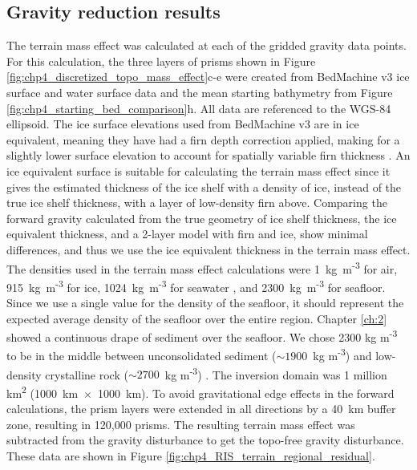 \subsection{Gravity reduction results}

The terrain mass effect was calculated at each of the gridded gravity data points. For this calculation, the three layers of prisms shown in Figure \ref{fig:chp4_discretized_topo_mass_effect}c-e were created from BedMachine v3 \citep{morlighemdeep2020, morlighemmeasures2022} ice surface and water surface data and the mean starting bathymetry from Figure \ref{fig:chp4_starting_bed_comparison}h. All data are referenced to the WGS-84 ellipsoid. The ice surface elevations used from BedMachine v3 are in ice equivalent, meaning they have had a firn depth correction applied, making for a slightly lower surface elevation to account for spatially variable firn thickness \citep{morlighemdeep2020}. An ice equivalent surface is suitable for calculating the terrain mass effect since it gives the estimated thickness of the ice shelf with a density of ice, instead of the true ice shelf thickness, with a layer of low-density firn above. Comparing the forward gravity calculated from the true geometry of ice shelf thickness, the ice equivalent thickness, and a 2-layer model with firn and ice, show minimal differences, and thus we use the ice equivalent thickness in the terrain mass effect. The densities used in the terrain mass effect calculations were 1~kg~m\textsuperscript{-3} for air, 915~kg~m\textsuperscript{-3} for ice, 1024~kg~m\textsuperscript{-3} for seawater \citep{griggsantarctic2011}, and 2300~kg~m\textsuperscript{-3} for seafloor. Since we use a single value for the density of the seafloor, it should represent the expected average density of the seafloor over the entire region. Chapter \ref{ch:2} showed a continuous drape of sediment over the seafloor. We chose 2300 kg m\textsuperscript{-3} to be in the middle between unconsolidated sediment ($\sim1900$~kg m\textsuperscript{-3}) and low-density crystalline rock ($\sim2700$~kg m\textsuperscript{-3}) \citep{schöndensity2015}. The inversion domain was 1 million km\textsuperscript{2} (1000~km~$\times$~1000~km). To avoid gravitational edge effects in the forward calculations, the prism layers were extended in all directions by a 40~km buffer zone, resulting in 120,000 prisms. The resulting terrain mass effect was subtracted from the gravity disturbance to get the topo-free gravity disturbance. These data are shown in Figure \ref{fig:chp4_RIS_terrain_regional_residual}.\\

